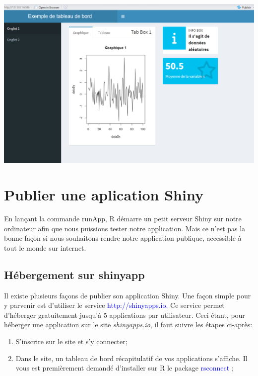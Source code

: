\documentclass[
]{article}
\begin{document}
\includegraphics{images/clipboard-1549962432.png}

\newpage

\hypertarget{publier-une-aplication-shiny}{%
\section{Publier une aplication
Shiny}\label{publier-une-aplication-shiny}}

En lançant la commande runApp, R démarre un petit serveur Shiny sur
notre ordinateur afin que nous puissions tester notre application. Mais
ce n'est pas la bonne façon si nous souhaitons rendre notre application
publique, accessible à tout le monde sur internet.

\hypertarget{huxe9bergement-sur-shinyapp}{%
\subsection{Hébergement sur
shinyapp}\label{huxe9bergement-sur-shinyapp}}

Il existe plusieurs façons de publier son application Shiny. Une façon
simple pour y parvenir est d'utiliser le service
\textcolor{blue}{http://shinyapps.io.} Ce service permet d'héberger
gratuitement jusqu'à 5 applications par utilisateur. Ceci étant, pour
héberger une application sur le site \emph{shinyapps.io}, il faut suivre
les étapes ci-après:

\begin{enumerate}
\def\labelenumi{\arabic{enumi}.}
\item
  S'inscrire sur le site et s'y connecter;
\item
  Dans le site, un tableau de bord récapitulatif de vos applications
  s'affiche. Il vous est premièrement demandé d'installer sur R le
  package \textcolor{blue}{rsconnect} ;
\end{enumerate}
\end{document}

